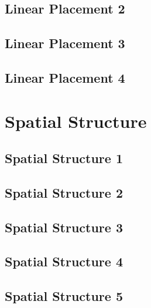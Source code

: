 \documentclass{scrartcl}
\begin{document}
\subsection{Linear Placement 2} 
\label{sec:linear_2}
\clearpage

\subsection{Linear Placement 3} 
\label{sec:linear_3}
\clearpage

\subsection{Linear Placement 4} 
\label{sec:linear_4}
\clearpage

\section{Spatial Structure}
\label{sec:spatial_structure}

\subsection{Spatial Structure 1}
\label{sec:spatial_1}
\clearpage

\subsection{Spatial Structure 2}
\label{sec:spatial_2}
\clearpage

\subsection{Spatial Structure 3}
\label{sec:spatial_3}
\clearpage

\subsection{Spatial Structure 4}
\label{sec:spatial_4}
\clearpage

\subsection{Spatial Structure 5}
\label{sec:spatial_5}
\clearpage
\end{document}
